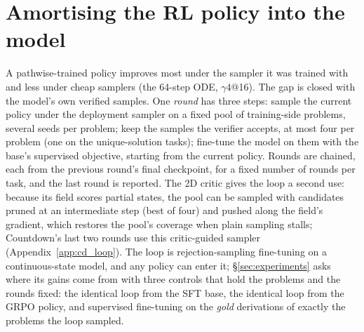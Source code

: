\section{Amortising the RL policy into the model}
\label{sec:loop}
A pathwise-trained policy improves most under the sampler it was trained with and less under cheap samplers (the 64-step ODE, $\gamma4$@16). The gap is closed with the model's own verified samples. One \emph{round} has three steps: sample the current policy under the deployment sampler on a fixed pool of training-side problems, several seeds per problem; keep the samples the verifier accepts, at most four per problem (one on the unique-solution tasks); fine-tune the model on them with the base's supervised objective, starting from the current policy. Rounds are chained, each from the previous round's final checkpoint, for a fixed number of rounds per task, and the last round is reported. The 2D critic gives the loop a second use: because its field scores partial states, the pool can be sampled with candidates pruned at an intermediate step (best of four) and pushed along the field's gradient, which restores the pool's coverage when plain sampling stalls; Countdown's last two rounds use this critic-guided sampler (Appendix~\ref{app:cd_loop}). The loop is rejection-sampling fine-tuning \citep{yuan2023rft,singh2023restem,zelikman2022star} on a continuous-state model, and any policy can enter it; \S\ref{sec:experiments} asks where its gains come from with three controls that hold the problems and the rounds fixed: the identical loop from the SFT base, the identical loop from the GRPO policy, and supervised fine-tuning on the \emph{gold} derivations of exactly the problems the loop sampled.
